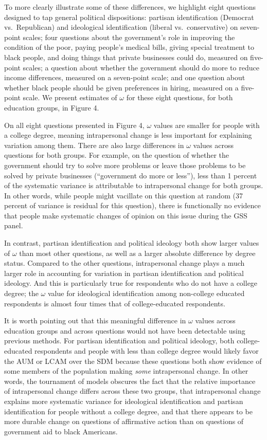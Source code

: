 \documentclass[
  11pt,
]{article}
\begin{document}
To more clearly illustrate some of these differences, we highlight eight
questions designed to tap general political dispositions: partisan
identification (Democrat vs.~Republican) and ideological identification
(liberal vs.~conservative) on seven-point scales; four questions about
the government's role in improving the condition of the poor, paying
people's medical bills, giving special treatment to black people, and
doing things that private businesses could do, measured on five-point
scales; a question about whether the government should do more to reduce
income differences, measured on a seven-point scale; and one question
about whether black people should be given preferences in hiring,
measured on a five-point scale. We present estimates of \(\omega\) for
these eight questions, for both education groups, in Figure 4.

On all eight questions presented in Figure 4, \(\omega\) values are
smaller for people with a college degree, meaning intrapersonal change
is less important for explaining variation among them. There are also
large differences in \(\omega\) values across questions for both groups.
For example, on the question of whether the government should try to
solve more problems or leave those problems to be solved by private
businesses (``government do more or less''), less than 1 percent of the
systematic variance is attributable to intrapersonal change for both
groups. In other words, while people might vacillate on this question at
random (37 percent of variance is residual for this question), there is
functionally no evidence that people make systematic changes of opinion
on this issue during the GSS panel.

In contrast, partisan identification and political ideology both show
larger values of \(\omega\) than most other questions, as well as a
larger absolute difference by degree status. Compared to the other
questions, intrapersonal change plays a much larger role in accounting
for variation in partisan identification and political ideology. And
this is particularly true for respondents who do not have a college
degree; the \(\omega\) value for ideological identification among
non-college educated respondents is almost four times that of
college-educated respondents.

It is worth pointing out that this meaningful difference in \(\omega\)
values across education groups and across questions would not have been
detectable using previous methods. For partisan identification and
political ideology, both college-educated respondents and people with
less than college degree would likely favor the AUM or LCAM over the SDM
because these questions both show evidence of some members of the
population making \emph{some} intrapersonal change. In other words, the
tournament of models obscures the fact that the relative importance of
intrapersonal change differs across these two groups, that intrapersonal
change explains more systematic variance for ideological identification
and partisan identification for people without a college degree, and
that there appears to be more durable change on questions of affirmative
action than on questions of government aid to black Americans.
\end{document}
